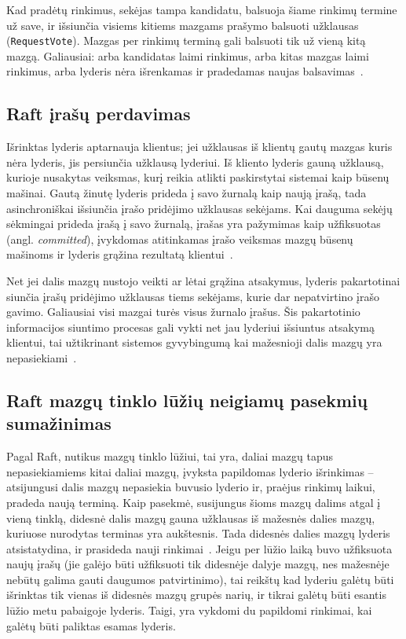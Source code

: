 \documentclass{VUMIFPSkursinis}
\begin{document}
Kad pradėtų rinkimus, sekėjas tampa kandidatu, balsuoja šiame rinkimų termine už save, ir išsiunčia visiems kitiems mazgams prašymo balsuoti užklausas (\texttt{RequestVote}). Mazgas per rinkimų terminą gali balsuoti tik už vieną kitą mazgą. Galiausiai: arba kandidatas laimi rinkimus, arba kitas mazgas laimi rinkimus, arba lyderis nėra išrenkamas ir pradedamas naujas balsavimas~\cite{ongaro_consensus}.

\subsection{Raft įrašų perdavimas}

Išrinktas lyderis aptarnauja klientus; jei užklausas iš klientų gautų mazgas kuris nėra lyderis, jis persiunčia užklausą lyderiui. Iš kliento lyderis gauną užklausą, kurioje nusakytas veiksmas, kurį reikia atlikti paskirstytai sistemai kaip būsenų mašinai. Gautą žinutę lyderis prideda į savo žurnalą kaip naują įrašą, tada asinchroniškai išsiunčia įrašo pridėjimo užklausas sekėjams. Kai dauguma sekėjų sėkmingai prideda įrašą į savo žurnalą, įrašas yra pažymimas kaip užfiksuotas (angl. \textit{committed}), įvykdomas atitinkamas įrašo veiksmas mazgų būsenų mašinoms ir lyderis grąžina rezultatą klientui~\cite{ongaro_consensus}. 

Net jei dalis mazgų nustojo veikti ar lėtai grąžina atsakymus, lyderis pakartotinai siunčia įrašų pridėjimo užklausas tiems sekėjams, kurie dar nepatvirtino įrašo gavimo. Galiausiai visi mazgai turės visus žurnalo įrašus. Šis pakartotinio informacijos siuntimo procesas gali vykti net jau lyderiui išsiuntus atsakymą klientui, tai užtikrinant sistemos gyvybingumą kai mažesnioji dalis mazgų yra nepasiekiami~\cite{ongaro_consensus}.

\subsection{Raft mazgų tinklo lūžių neigiamų pasekmių sumažinimas}

Pagal Raft, nutikus mazgų tinklo lūžiui, tai yra, daliai mazgų tapus nepasiekiamiems kitai daliai mazgų, įvyksta papildomas lyderio išrinkimas -- atsijungusi dalis mazgų nepasiekia buvusio lyderio ir, praėjus rinkimų laikui, pradeda naują terminą. Kaip pasekmė, susijungus šioms mazgų dalims atgal į vieną tinklą, didesnė dalis mazgų gauna užklausas iš mažesnės dalies mazgų, kuriuose nurodytas terminas yra aukštesnis. Tada didesnės dalies mazgų lyderis atsistatydina, ir prasideda nauji rinkimai~\cite{ongaro_consensus}. Jeigu per lūžio laiką buvo užfiksuota naujų įrašų (jie galėjo būti užfiksuoti tik didesnėje dalyje mazgų, nes mažesnėje nebūtų galima gauti daugumos patvirtinimo), tai reikštų kad lyderiu galėtų būti išrinktas tik vienas iš didesnės mazgų grupės narių, ir tikrai galėtų būti esantis lūžio metu pabaigoje lyderis. Taigi, yra vykdomi du papildomi rinkimai, kai galėtų būti paliktas esamas lyderis.
\end{document}
